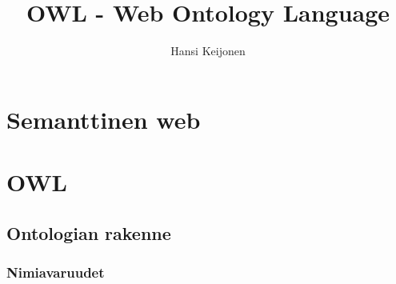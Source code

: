 \documentclass[a4paper,10pt]{article}
\title{OWL - Web Ontology Language}
\author{Hansi Keijonen}
\begin{document}
\maketitle

\begin{abstract}

\end{abstract}

\section{Semanttinen web}
\section{OWL}
\subsection{Ontologian rakenne}
\subsubsection{Nimiavaruudet}
\end{document}
